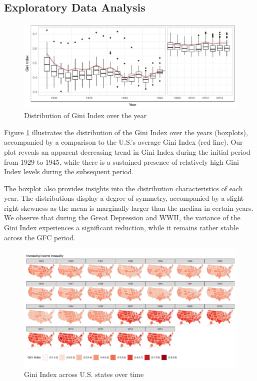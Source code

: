 \documentclass[11pt,a4paper,]{article}
\begin{document}
\hypertarget{exploratory-data-analysis}{%
\subsection{Exploratory Data Analysis}\label{exploratory-data-analysis}}

\begin{figure}
\centering
\includegraphics{Assignment_2_ETF5500_files/figure-latex/edaboxplot-1.pdf}
\caption{\label{fig:edaboxplot}Distribution of Gini Index over the year}
\end{figure}

Figure \ref{fig:edaboxplot} illustrates the distribution of the Gini Index over the years (boxplots), accompanied by a comparison to the U.S.'s average Gini Index (red line). Our plot reveals an apparent decreasing trend in Gini Index during the initial period from 1929 to 1945, while there is a sustained presence of relatively high Gini Index levels during the subsequent period.

The boxplot also provides insights into the distribution characteristics of each year. The distributions display a degree of symmetry, accompanied by a slight right-skewness as the mean is marginally larger than the median in certain years. We observe that during the Great Depression and WWII, the variance of the Gini Index experiences a significant reduction, while it remains rather stable across the GFC period.

\begin{figure}
\centering
\includegraphics{Assignment_2_ETF5500_files/figure-latex/edamap-1.pdf}
\caption{\label{fig:edamap}Gini Index across U.S. states over time}
\end{figure}
\end{document}
